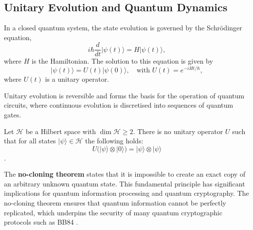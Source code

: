
\subsection{Unitary Evolution and Quantum Dynamics}
\label{subsec:unitary_evolution}

\begin{definition}
In a closed quantum system, the state evolution is governed by the Schrödinger equation,
\[
i\hbar \frac{d}{dt} |\psi(t)\rangle = H |\psi(t)\rangle,
\]
where \(H\) is the Hamiltonian. The solution to this equation is given by
\[
|\psi(t)\rangle = U(t)|\psi(0)\rangle, \quad \text{with } U(t)=e^{-iHt/\hbar},
\]
where \(U(t)\) is a unitary operator.
\end{definition}

\begin{remark}
Unitary evolution is reversible and forms the basis for the operation of quantum circuits, where continuous evolution is discretised into sequences of quantum gates.
\end{remark}

\begin{theorem}
    Let \(\mathcal{H}\) be a Hilbert space with \(\dim \mathcal{H} \ge 2\). There is no unitary operator \(U\) such that for all states \(|\psi\rangle \in \mathcal{H}\) the following holds:
    \[
    U\big(|\psi\rangle \otimes |0\rangle\big) = |\psi\rangle \otimes |\psi\rangle
    \]\cite{wootters1982single}.
\end{theorem}

\begin{observation}
    The \textbf{no-cloning theorem} states that it is impossible to create an exact copy of an arbitrary unknown quantum state. This fundamental principle has significant implications for quantum information processing and quantum cryptography.
    The no-cloning theorem ensures that quantum information cannot be perfectly replicated, which underpins the security of many quantum cryptographic protocols such as BB84 \cite{bennett1984quantum}.
\end{observation}